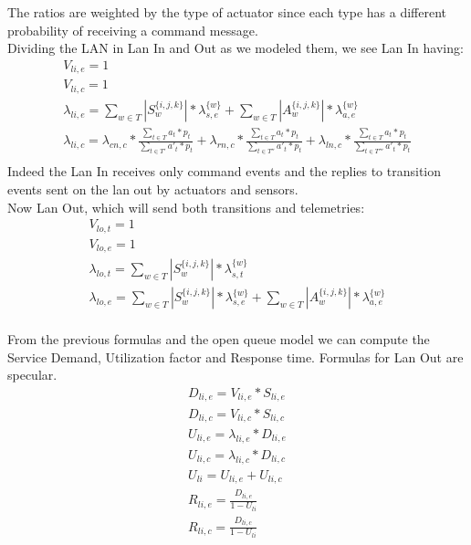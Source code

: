 \documentclass[11pt]{article}
\begin{document}
The ratios are weighted by the type of actuator since each type has a different probability of receiving a command message.\\
Dividing the LAN in Lan In and Out as we modeled them, we see Lan In having:
\begin{equation}
    \begin{array}{l}
        V_{li, e} = 1 \\ %
        V_{li,c} = 1 \\
        \lambda_{li, e} = \sum\limits_{w \in T}{| S^{\{i,j,k\}}_{w} | * \lambda^{\{w\}}_{s, e}} + \sum\limits_{w \in T}{| A^{\{i,j,k\}}_{w} | * \lambda^{\{w\}}_{a, e}}\\
		\lambda_{li, c} = \lambda_{cn, c} * \frac{\sum\limits_{t \in T}{a_{t} * p_{t}}}{\sum\limits_{t \in T'}{a'_{t} * p_{t}}} + \lambda_{rn, c} *\frac{\sum\limits_{t \in T}{a_{t} * p_{t}}}{\sum\limits_{t \in T''}{a'_{t} * p_{t}}}  + \lambda_{ln, c} * \frac{\sum\limits_{t \in T}{a_{t} * p_{t}}}{\sum\limits_{t \in T'''}{a'_{t} * p_{t}}}  \\\

    \end{array}
\end{equation}
Indeed the Lan In receives only command events and the replies to transition events sent on the lan out by actuators and sensors.\\
Now Lan Out, which will send both transitions and telemetries:
\begin{equation}
    \begin{array}{l}
        V_{lo, t} = 1 \\
        V_{lo, e} = 1 \\ %
        \lambda_{lo, t} = \sum\limits_{w \in T}{| S^{\{i,j,k\}}_{w} | * \lambda^{\{w\}}_{s, t}}  \\
        \lambda_{lo, e} = \sum\limits_{w \in T}{| S^{\{i,j,k\}}_{w} | * \lambda^{\{w\}}_{s, e}} + \sum\limits_{w \in T}{| A^{\{i,j,k\}}_{w} | * \lambda^{\{w\}}_{a, e}}\\


    \end{array}
\end{equation}

From the previous formulas and the open queue model we can compute the Service Demand, Utilization factor and Response time. Formulas for Lan Out are specular.
\begin{equation}
    \begin{array}{l}
        D_{li, e} = V_{li, e} * S_{li, e} \\
        D_{li, c} = V_{li, c} * S_{li, c} \\
        U_{li, e} = \lambda_{li, e} * D_{li, e} \\
        U_{li, c} = \lambda_{li, c} * D_{li, c} \\
        U_{li} = U_{li, e} + U_{li, c} \\
        R_{li, e} = \frac{D_{li, e}}{1 - U_{li}} \\
        R_{li, c} = \frac{D_{li, c}}{1 - U_{li}} \\
    \end{array}
\end{equation}
\end{document}

